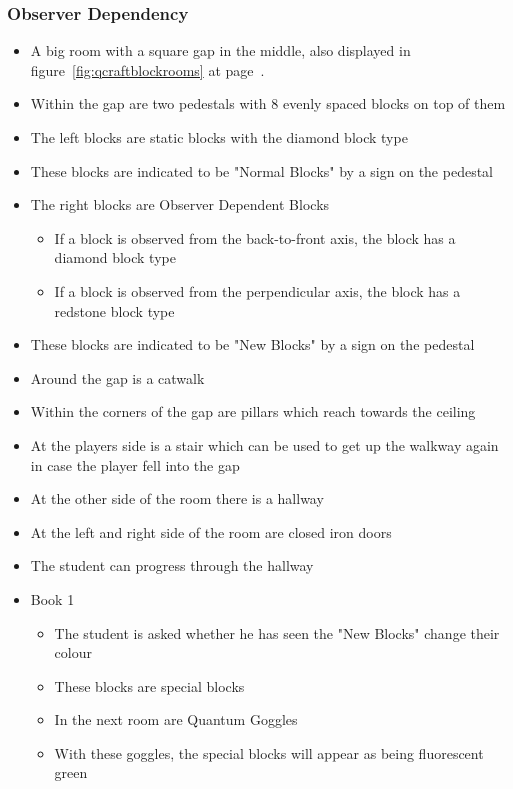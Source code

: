\documentclass[11pt,twoside]{report} %
\begin{document}
\subsubsection{Observer Dependency}
\begin{itemize}
	\item A big room with a square gap in the middle, also displayed in figure~\ref{fig:qcraftblockrooms} at page~\pageref{fig:qcraftblockrooms}.
	\item Within the gap are two pedestals with 8 evenly spaced blocks on top of them
	\item The left blocks are static blocks with the diamond block type
	\item These blocks are indicated to be "Normal Blocks" by a sign on the pedestal
	\item The right blocks are Observer Dependent Blocks
	\begin{itemize}
		\item If a block is observed from the back-to-front axis, the block has a diamond block type
		\item If a block is observed from the perpendicular axis, the block has a redstone block type
	\end{itemize}
	\item These blocks are indicated to be "New Blocks" by a sign on the pedestal
	\item Around the gap is a catwalk
	\item Within the corners of the gap are pillars which reach towards the ceiling
	\item At the players side is a stair which can be used to get up the walkway again in case the player fell into the gap
	\item At the other side of the room there is a hallway
	\item At the left and right side of the room are closed iron doors
	\item The student can progress through the hallway
	\item Book 1
	\begin{itemize}
		\item The student is asked whether he has seen the "New Blocks" change their colour
		\item These blocks are special blocks
		\item In the next room are Quantum Goggles
		\item With these goggles, the special blocks will appear as being fluorescent green
	\end{itemize}

\end{itemize}
\end{document}
